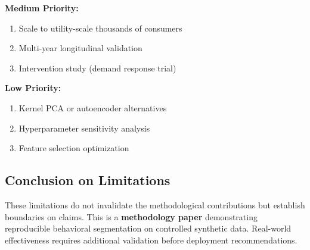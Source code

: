 \textbf{Medium Priority:}
\begin{enumerate}
    \item Scale to utility-scale thousands of consumers
    \item Multi-year longitudinal validation
    \item Intervention study (demand response trial)
\end{enumerate}

\textbf{Low Priority:}
\begin{enumerate}
    \item Kernel PCA or autoencoder alternatives
    \item Hyperparameter sensitivity analysis
    \item Feature selection optimization
\end{enumerate}

\subsection{Conclusion on Limitations}

These limitations do not invalidate the methodological contributions but establish boundaries on claims. This is a \textbf{methodology paper} demonstrating reproducible behavioral segmentation on controlled synthetic data. Real-world effectiveness requires additional validation before deployment recommendations.

